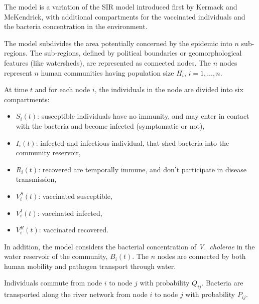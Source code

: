 The model is a variation of the SIR model introduced first by Kermack and McKendrick\cite{Kermack:ContributionMathematicalTheory:1927}, with additional compartments for the vaccinated individuals and the bacteria concentration in the environment.

The model subdivides the area potentially concerned by the epidemic into $n$ sub-regions. The sub-regions, defined by political boundaries or geomorphological features (like watersheds\cite{Bertuzzo:ProbabilityExtinctionHaiti:2016}), are represented as connected nodes. The $n$ nodes represent $n$ human communities having population size $H_i$, $i=1,\dots, n$. 

At time $t$ and for each node $i$, the individuals in the node are divided into six compartments:
\begin{itemize}
\item $S_i(t)$: susceptible individuals  have no immunity, and may enter in contact with the bacteria and become infected (symptomatic or not),
\item $I_i(t)$: infected and infectious individual, that shed bacteria into the community reservoir,
\item $R_i(t)$: recovered are temporally immune, and don't participate in disease transmission,
\item $V^S_i(t)$: vaccinated susceptible,
\item $V^I_i(t)$: vaccinated infected,
\item $V^R_i(t)$: vaccinated recovered.
\end{itemize}

In addition, the model considers the bacterial concentration of \textit{V.~cholerae} in the water reservoir of the community, $B_i(t)$. The $n$ nodes are connected by both human mobility and pathogen transport through water.

Individuals commute from node $i$ to node $j$ with probability $Q_{ij}$. Bacteria are transported along the river network from node $i$ to node $j$ with probability $P_{ij}$.

